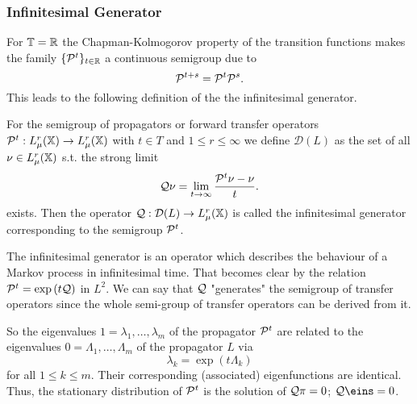 \subsubsection*{Infinitesimal Generator}

For $\mathbb{T} = \mathbb{R}$ the Chapman-Kolmogorov property of the transition functions makes the family $\{\mathcal{P}^t\}_{t\in\mathbb{R}}$ a continuous semigroup due to 
\begin{equation*}
\mathcal{P}^{t+s} = \mathcal{P}^t \mathcal{P}^s.
\end{equation*}
This leads to the following definition of the the infinitesimal generator. 

\begin{defi}
For the semigroup of propagators or forward transfer operators $\mathcal{P}^t : L_\mu^r (\mathbb{X}) \rightarrow L_\mu^r (\mathbb{X})$ with $t \in T$ and $1\leq r \leq \infty$ we define $\mathcal{D}(L)$ as the set of all $\nu \in L_\mu^r(\mathbb{X})$ s.t. the strong limit
\begin{equation*}
\mathcal{Q} \nu = \lim_{t \rightarrow \infty} \frac{\mathcal{P}^t\nu-\nu}{t}.
\end{equation*}
exists. Then the operator $\mathcal{Q}: \mathcal{D}(L) \rightarrow L_\mu^r(\mathbb{X})$ is called the infinitesimal generator corresponding to the semigroup $\mathcal{P}^t$.
\end{defi}

The infinitesimal generator is an operator which describes the behaviour of a Markov process in infinitesimal time. That becomes clear by the relation $\mathcal{P}^t = \exp{(t \mathcal{Q})}$ in $L^2$.  We can say that $\mathcal{Q}$ "generates" the semigroup of transfer operators since the whole semi-group of transfer operators can be derived from it.

So the eigenvalues $1 = \lambda_1,\dots,\lambda_m$ of the propagator $\mathcal{P}^t$ are related to the eigenvalues $0 = \Lambda_1,\dots,\Lambda_m$ of the propagator $L$ via 
\begin{equation*}
\lambda_k = \exp(t\Lambda_k)
\end{equation*}
for all $1\leq k \leq m$. Their corresponding (associated) eigenfunctions are identical.
Thus, the stationary distribution of $\mathcal{P}^t$ is the solution of $\mathcal{Q}\pi = 0$;  $\Qcal\eins = 0$. 